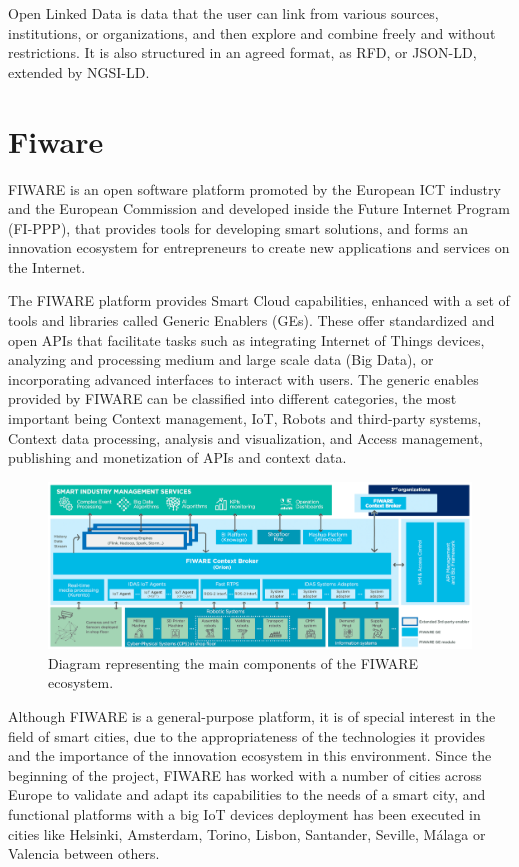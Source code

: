 Open Linked Data is data that the user can link from various sources, institutions, or organizations, and then explore and combine freely and without restrictions. It is also structured in an agreed format, as RFD, or JSON-LD, extended by NGSI-LD.

\clearpage

\section{Fiware}
\label{section:Fiware}

FIWARE \cite{fiware} is an open software platform promoted by the European ICT industry and the European Commission and developed inside the Future Internet Program (FI-PPP), that provides tools for developing smart solutions, and forms an innovation ecosystem for entrepreneurs to create new applications and services on the Internet. 

The FIWARE platform provides Smart Cloud capabilities, enhanced with a set of tools and libraries called Generic Enablers (GEs). These offer standardized and open APIs that facilitate tasks such as integrating Internet of Things devices, analyzing and processing medium and large scale data (Big Data), or incorporating advanced interfaces to interact with users. The generic enables provided by FIWARE can be classified into different categories, the most important being Context management, IoT, Robots and third-party systems, Context data processing, analysis and visualization, and Access management, publishing and monetization of APIs and context data.

\begin{figure}[H]
	\centering
	\includegraphics[width=1\linewidth]{imagenes/fiware-architecture.png}
	\caption{Diagram representing the main components of the FIWARE ecosystem. \cite{fiware-docs}}
	\label{fiware-architecture}
\end{figure}

Although FIWARE is a general-purpose platform, it is of special interest in the field of smart cities, due to the appropriateness of the technologies it provides and the importance of the innovation ecosystem in this environment. Since the beginning of the project, FIWARE has worked with a number of cities across Europe to validate and adapt its capabilities to the needs of a smart city, and functional platforms with a big IoT devices deployment has been executed in cities like Helsinki, Amsterdam, Torino, Lisbon, Santander, Seville, Málaga or Valencia between others.

